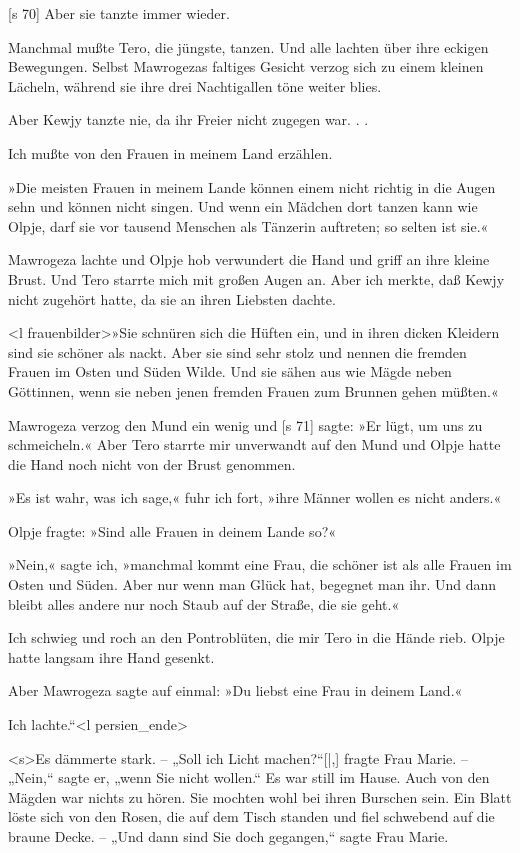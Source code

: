 [s 70]
Aber sie tanzte immer wieder.

Manchmal mußte Tero, die jüngste, tanzen.
Und alle lachten über ihre eckigen Bewegungen. Selbst
Mawrogezas faltiges Gesicht verzog sich zu einem
kleinen Lächeln, während sie ihre drei Nachtigallen­
töne weiter blies.

Aber Kewjy tanzte nie, da ihr Freier nicht
zugegen war. . .

Ich mußte von den Frauen in meinem Land erzählen.

»Die meisten Frauen in meinem Lande können
einem nicht richtig in die Augen sehn und können
nicht singen. Und wenn ein Mädchen dort tanzen
kann wie Olpje, darf sie vor tausend Menschen als
Tänzerin auftreten; so selten ist sie.«

Mawrogeza lachte und Olpje hob verwundert
die Hand und griff an ihre kleine Brust. Und Tero
starrte mich mit großen Augen an. Aber ich merkte,
daß Kewjy nicht zugehört hatte, da sie an ihren
Liebsten dachte.

<l frauenbilder>»Sie schnüren sich die Hüften ein, und in ihren
dicken Kleidern sind sie schöner als nackt. Aber sie
sind sehr stolz und nennen die fremden Frauen im
Osten und Süden Wilde. Und sie sähen aus wie
Mägde neben Göttinnen, wenn sie neben jenen fremden
Frauen zum Brunnen gehen müßten.«

Mawrogeza verzog den Mund ein wenig und
[s 71]
sagte: »Er lügt, um uns zu schmeicheln.« Aber Tero
starrte mir unverwandt auf den Mund und Olpje
hatte die Hand noch nicht von der Brust genommen.

»Es ist wahr, was ich sage,« fuhr ich fort,
»ihre Männer wollen es nicht anders.«

Olpje fragte: »Sind alle Frauen in deinem Lande
so?«

»Nein,« sagte ich, »manchmal kommt eine Frau,
die schöner ist als alle Frauen im Osten und Süden.
Aber nur wenn man Glück hat, begegnet man ihr.
Und dann bleibt alles andere nur noch Staub auf der
Straße, die sie geht.«

Ich schwieg und roch an den Pontroblüten, die
mir Tero in die Hände rieb. Olpje hatte langsam
ihre Hand gesenkt.

Aber Mawrogeza sagte auf einmal: »Du liebst
eine Frau in deinem Land.«

Ich lachte.“<l persien_ende>

<s>Es dämmerte stark. – „Soll ich Licht machen?“[|,]
fragte Frau Marie. – „Nein,“ sagte er, „wenn Sie
nicht wollen.“ Es war still im Hause. Auch von
den Mägden war nichts zu hören. Sie mochten wohl
bei ihren Burschen sein. Ein Blatt löste sich von
den Rosen, die auf dem Tisch standen und fiel
schwebend auf die braune Decke. – „Und dann
sind Sie doch gegangen,“ sagte Frau Marie.

